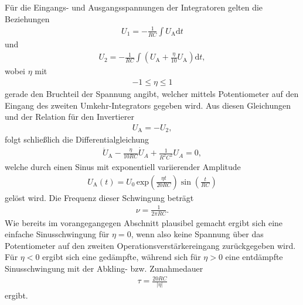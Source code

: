 Für die Eingangs- und Ausgangsspannungen der Integratoren gelten die Beziehungen
\begin{align}
  U_1 = - \frac1{RC} \int U_\text{A} \mathrm{d}t
\end{align}
und
\begin{align}
  U_2 = - \frac1{RC} \int \left(U_\text{A} +\frac{\eta}{10} U_\text{A} \right) \mathrm{d}t,
\end{align}
wobei $\eta$ mit
\begin{align}
  -1 \leq \eta \leq 1
\end{align}
gerade den Bruchteil der Spannung angibt, welcher mittels Potentiometer auf den Eingang des
zweiten Umkehr-Integrators gegeben wird. Aus diesen Gleichungen und der Relation für den Invertierer
\begin{align}
  U_\text{A} = - U_2,
\end{align}
folgt schließlich die Differentialgleichung
\begin{align}
  \ddot{U}_\text{A} - \frac{\eta}{10 RC} \dot{U}_A + \frac1{R^2 C^2} U_A = 0,
\end{align}
welche durch einen Sinus mit exponentiell variierender Amplitude
\begin{align}
  U_\text{A}(t) = U_0 \, \text{exp} \left( \frac{\eta t}{20 RC} \right) \sin \left( \frac{t}{RC} \right)
\end{align}
gelöst wird. Die Frequenz dieser Schwingung beträgt
\begin{align}
  \nu = \frac1{2 \pi R C}.
  \label{eqn:freqexp}
\end{align}
Wie bereits im vorangegangegen Abschnitt plausibel gemacht ergibt sich eine einfache
Sinusschwingung für $\eta = 0$, wenn also keine Spannung über das Potentiometer auf den zweiten
Operationsverstärkereingang zurückgegeben wird. Für $\eta < 0$ ergibt sich eine gedämpfte, während sich für
$\eta > 0$ eine entdämpfte Sinusschwingung mit der Abkling- bzw. Zunahmedauer
\begin{align}
  \tau = \frac{20 RC}{\lvert\eta\rvert}
  \label{eqn:tauentdämpft}
\end{align}
ergibt.

